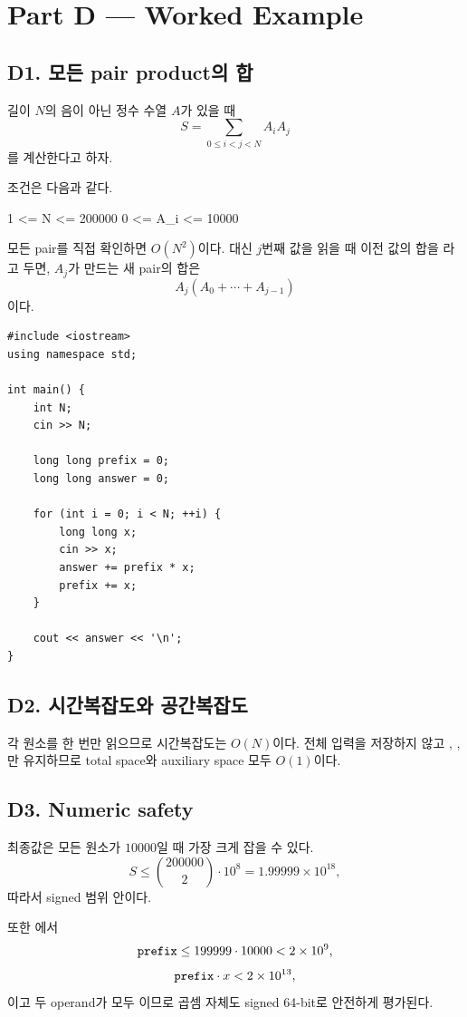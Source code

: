 \section{Part D --- Worked Example}

\subsection{D1. 모든 pair product의 합}
길이 $N$의 음이 아닌 정수 수열 $A$가 있을 때
\[
S=\sum_{0\le i<j<N}A_iA_j
\]
를 계산한다고 하자.

조건은 다음과 같다.
\begin{TextBlock}
1 <= N <= 200000
0 <= A_i <= 10000
\end{TextBlock}

모든 pair를 직접 확인하면 $O(N^2)$이다. 대신 $j$번째 값을 읽을 때 이전 값의 합을 라고 두면, $A_j$가 만드는 새 pair의 합은
\[
A_j(A_0+\cdots+A_{j-1})
\]
이다.

\begin{lstlisting}
#include <iostream>
using namespace std;

int main() {
    int N;
    cin >> N;

    long long prefix = 0;
    long long answer = 0;

    for (int i = 0; i < N; ++i) {
        long long x;
        cin >> x;
        answer += prefix * x;
        prefix += x;
    }

    cout << answer << '\n';
}
\end{lstlisting}

\subsection{D2. 시간복잡도와 공간복잡도}
각 원소를 한 번만 읽으므로 시간복잡도는 $O(N)$이다. 전체 입력을 저장하지 않고 , , 만 유지하므로 total space와 auxiliary space 모두 $O(1)$이다.

\subsection{D3. Numeric safety}
최종값은 모든 원소가 $10000$일 때 가장 크게 잡을 수 있다.
\[
S\le \binom{200000}{2}\cdot10^8
=1.99999\times10^{18},
\]
따라서 signed  범위 안이다.

또한 에서
\[
\texttt{prefix}\le 199999\cdot10000<2\times10^9,
\]
\[
\texttt{prefix}\cdot x<2\times10^{13},
\]
이고 두 operand가 모두 이므로 곱셈 자체도 signed 64-bit로 안전하게 평가된다.

